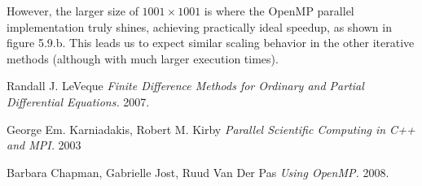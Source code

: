 \documentclass[11pt]{report}
\begin{document}
However, the larger size of $1001 \times 1001$ is where the OpenMP parallel implementation truly shines, achieving practically ideal speedup, as shown in figure 5.9.b. This leads us to expect similar scaling behavior in the other iterative methods (although with much larger execution times).
\newline




\begin{thebibliography}{1}

   Randall J. LeVeque {\em Finite Difference Methods for Ordinary and Partial Differential Equations.}  2007.

   George Em. Karniadakis, Robert M. Kirby {\em Parallel Scientific Computing in C++ and MPI.} 2003 

   Barbara Chapman, Gabrielle Jost, Ruud Van Der Pas {\em Using OpenMP.} 2008.

  \end{thebibliography}
\end{document}
